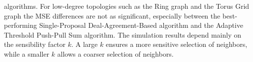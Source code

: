 algorithms. For low-degree topologies such as the Ring graph and the Torus Grid graph the MSE differences are not as significant, especially between the best-performing Single-Proposal Deal-Agreement-Based algorithm and the Adaptive Threshold Push-Pull Sum algorithm. The simulation results depend mainly on the sensibility factor $k$. A large $k$ ensures a more sensitive selection of neighbors, while a smaller $k$ allows a coarser selection of neighbors.